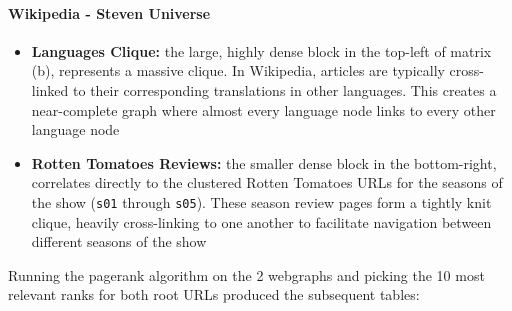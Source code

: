 \documentclass[unicode,11pt,a4paper,oneside,numbers=endperiod,openany]{scrartcl}
\begin{document}
\paragraph{Wikipedia - Steven Universe}
\begin{itemize}
    \item \textbf{Languages Clique:} the large, highly dense block in the top-left of matrix (b), represents a massive clique. In Wikipedia, articles are typically cross-linked to their corresponding translations in other languages. This creates a near-complete graph where almost every language node links to every other language node
    \item \textbf{Rotten Tomatoes Reviews:} the smaller dense block in the bottom-right, correlates directly to the clustered Rotten Tomatoes URLs for the seasons of the show (\texttt{s01} through \texttt{s05}). These season review pages form a tightly knit clique, heavily cross-linking to one another to facilitate navigation between different seasons of the show
\end{itemize}
Running the pagerank algorithm on the 2 webgraphs and picking the 10 most relevant ranks for both root URLs produced the subsequent tables:
\vspace{1em}
\end{document}
